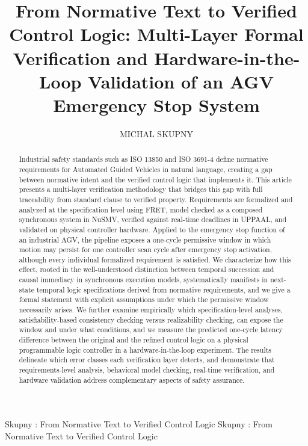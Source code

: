 \documentclass{ieeeaccess}
\theoremstyle{definition}
\begin{document}

\title{From Normative Text to Verified Control Logic: Multi-Layer Formal Verification and Hardware-in-the-Loop Validation of an AGV Emergency Stop System}

\author{\uppercase{Michal Skupny}}

\address[1]{Institute of Robotics and Machine Intelligence, Poznan University of Technology, Piotrowo 3A, 60-965 Pozna\'{n}, Poland (e-mail: michal.skupny@put.poznan.pl;)}


\markboth
{Skupny \headeretal: From Normative Text to Verified Control Logic}
{Skupny \headeretal: From Normative Text to Verified Control Logic}


\begin{abstract}
Industrial safety standards such as ISO 13850 and ISO 3691-4 define normative requirements for Automated Guided Vehicles in natural language, creating a gap between normative intent and the verified control logic that implements it. This article presents a multi-layer verification methodology that bridges this gap with full traceability from standard clause to verified property. Requirements are formalized and analyzed at the specification level using FRET, model checked as a composed synchronous system in NuSMV, verified against real-time deadlines in UPPAAL, and validated on physical controller hardware. Applied to the emergency stop function of an industrial AGV, the pipeline exposes a one-cycle permissive window in which motion may persist for one controller scan cycle after emergency stop activation, although every individual formalized requirement is satisfied. We characterize how this effect, rooted in the well-understood distinction between temporal succession and causal immediacy in synchronous execution models, systematically manifests in next-state temporal logic specifications derived from normative requirements, and we give a formal statement with explicit assumptions under which the permissive window necessarily arises. We further examine empirically which specification-level analyses, satisfiability-based consistency checking versus realizability checking, can expose the window and under what conditions, and we measure the predicted one-cycle latency difference between the original and the refined control logic on a physical programmable logic controller in a hardware-in-the-loop experiment. The results delineate which error classes each verification layer detects, and demonstrate that requirements-level analysis, behavioral model checking, real-time verification, and hardware validation address complementary aspects of safety assurance.
\end{abstract}
\end{document}
